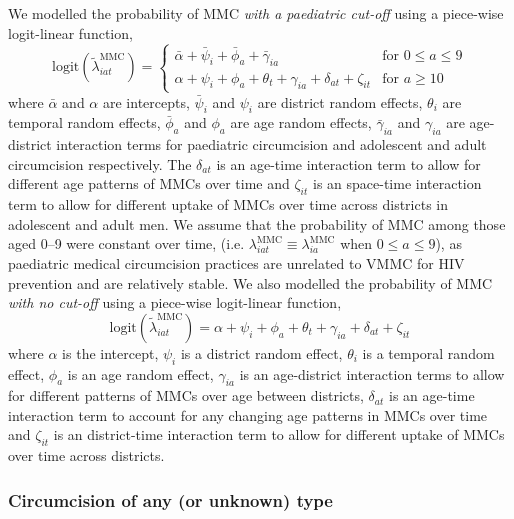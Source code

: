 \documentclass{article}
\begin{document}
\begin{appendix}
We modelled the probability of MMC {\it with a paediatric cut-off} using a piece-wise logit-linear function, 
\begin{equation*}
	\text{logit}(\tilde{\lambda}^{\text{MMC}}_{iat}) =
	\begin{cases}
		\bar{\alpha} + \bar{\psi}_i + \bar{\phi}_a + \bar{\gamma}_{ia} & \text{for } 0 \leq a \leq 9\\
		\alpha + \psi_i + \phi_a + \theta_t + \gamma_{ia} + \delta_{at} + \zeta_{it} & \text{for } a \geq 10
	\end{cases} 
\end{equation*}
where $\bar{\alpha}$ and $\alpha$ are intercepts, $\bar{\psi}_i$ and $\psi_i$ are district random effects, $\theta_i$ are temporal random effects, $\bar{\phi}_a$ and $\phi_a$ are age random effects, $\bar{\gamma}_{ia}$ and $\gamma_{ia}$ are age-district interaction terms for paediatric circumcision and adolescent and adult circumcision respectively. The $\delta_{at}$ is an age-time interaction term to allow for different age patterns of MMCs over time and $\zeta_{it}$ is an space-time interaction term to allow for different uptake of MMCs over time across districts in adolescent and adult men. We assume that the probability of MMC among those aged 0--9 were constant over time, (i.e. $\lambda^{\text{MMC}}_{iat} \equiv \lambda^{\text{MMC}}_{ia}$ when $0\leq a \leq 9$), as paediatric medical circumcision practices are unrelated to VMMC for HIV prevention and are relatively stable. We also modelled the probability of MMC {\it with no cut-off} using a piece-wise logit-linear function, 
\begin{equation*}
	\text{logit}(\tilde{\lambda}^{\text{MMC}}_{iat}) = \alpha + \psi_i + \phi_a + \theta_t + \gamma_{ia} + \delta_{at} + \zeta_{it} 
\end{equation*}
where $\alpha$ is the intercept, $\psi_i$ is a district random effect, $\theta_i$ is a temporal random effect, $\phi_a$ is an age random effect, $\gamma_{ia}$ is an age-district interaction terms to allow for different patterns of MMCs over age between districts, $\delta_{at}$ is an age-time interaction term to account for any changing age patterns in MMCs over time and $\zeta_{it}$ is an district-time interaction term to allow for different uptake of MMCs over time across districts. 


\subsubsection*{Circumcision of any (or unknown) type}


\end{appendix}
\end{document}
